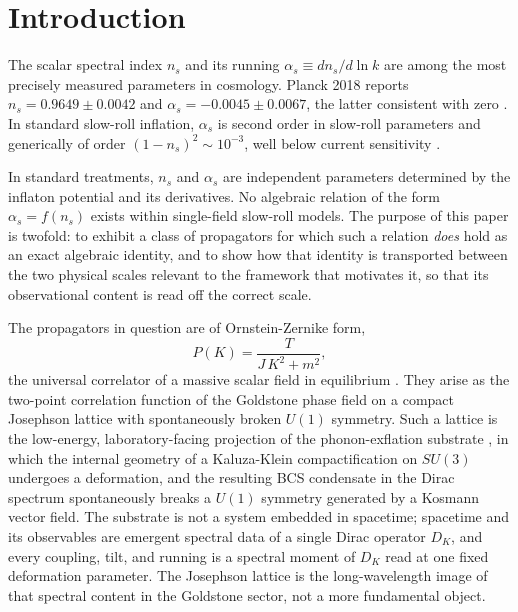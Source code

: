 \documentclass[12pt]{article}
\theoremstyle{definition}
\theoremstyle{remark}
\begin{document}
\section{Introduction}

The scalar spectral index $n_s$ and its running $\alpha_s \equiv dn_s/d\ln k$ are among the most precisely measured parameters in cosmology. Planck 2018 reports $n_s = 0.9649 \pm 0.0042$ and $\alpha_s = -0.0045 \pm 0.0067$, the latter consistent with zero \citep{Planck2018VI}. In standard slow-roll inflation, $\alpha_s$ is second order in slow-roll parameters and generically of order $(1 - n_s)^2 \sim 10^{-3}$, well below current sensitivity \citep{LiddleLyth2000,KosowskyTurner1995}.

In standard treatments, $n_s$ and $\alpha_s$ are independent parameters determined by the inflaton potential and its derivatives. No algebraic relation of the form $\alpha_s = f(n_s)$ exists within single-field slow-roll models. The purpose of this paper is twofold: to exhibit a class of propagators for which such a relation \emph{does} hold as an exact algebraic identity, and to show how that identity is transported between the two physical scales relevant to the framework that motivates it, so that its observational content is read off the correct scale.

The propagators in question are of Ornstein-Zernike form,
\begin{equation}\label{eq:OZ}
  P(K) = \frac{T}{J\,K^2 + m^2},
\end{equation}
the universal correlator of a massive scalar field in equilibrium \citep{OrnsteinZernike1914,ChaikinLubensky1995}. They arise as the two-point correlation function of the Goldstone phase field on a compact Josephson lattice with spontaneously broken $U(1)$ symmetry. Such a lattice is the low-energy, laboratory-facing projection of the phonon-exflation substrate \citep{PhononExflation}, in which the internal geometry of a Kaluza-Klein compactification on $SU(3)$ undergoes a deformation, and the resulting BCS condensate in the Dirac spectrum spontaneously breaks a $U(1)$ symmetry generated by a Kosmann vector field. The substrate is not a system embedded in spacetime; spacetime and its observables are emergent spectral data of a single Dirac operator $D_K$, and every coupling, tilt, and running is a spectral moment of $D_K$ read at one fixed deformation parameter. The Josephson lattice is the long-wavelength image of that spectral content in the Goldstone sector, not a more fundamental object.
\end{document}
